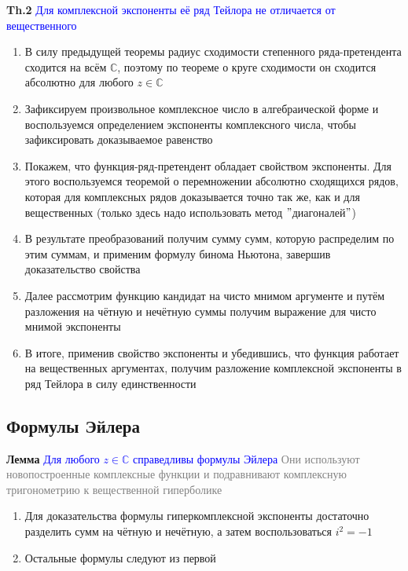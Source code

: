 \textbf{Th.2} \textcolor{blue}{Для комплексной экспоненты её ряд Тейлора не отличается от вещественного}

\begin{enumerate}
    \item В силу предыдущей теоремы радиус сходимости степенного ряда-претендента сходится на всём $\mathbb{C}$,
    поэтому по теореме о круге сходимости он сходится абсолютно для любого $z \in \mathbb{C}$
    \item Зафиксируем произвольное комплексное число в алгебраической форме и воспользуемся определением
    экспоненты комплексного числа, чтобы зафиксировать доказываемое равенство
    \item Покажем, что функция-ряд-претендент обладает свойством экспоненты.
    Для этого воспользуемся теоремой о перемножении абсолютно сходящихся рядов, которая для комплексных рядов
    доказывается точно так же, как и для вещественных (только здесь надо использовать метод \("\)диагоналей\("\))
    \item В результате преобразований получим сумму сумм, которую распределим по этим суммам, и применим формулу
    бинома Ньютона, завершив доказательство свойства
    \item Далее рассмотрим функцию кандидат на чисто мнимом аргументе и путём разложения на чётную и нечётную
    суммы получим выражение для чисто мнимой экспоненты
    \item В итоге, применив свойство экспоненты и убедившись, что функция работает на вещественных аргументах,
    получим разложение комплексной экспоненты в ряд Тейлора в силу единственности
\end{enumerate}

\subsection{Формулы Эйлера}

\textbf{Лемма} \textcolor{blue}{Для любого $z \in \mathbb{C}$ справедливы формулы Эйлера} \textcolor{gray}{Они
используют новопостроенные комплексные функции и подравнивают комплексную тригонометрию к вещественной гиперболике}

\begin{enumerate}
    \item Для доказательства формулы гиперкомплексной экспоненты достаточно разделить сумм на чётную и нечётную,
    а затем воспользоваться $i^2 = -1$
    \item Остальные формулы следуют из первой
\end{enumerate}

